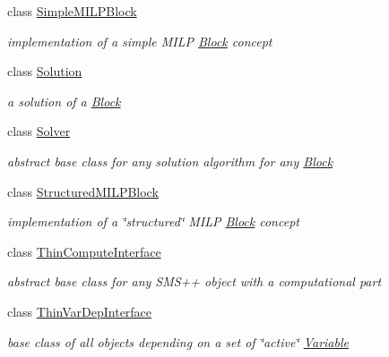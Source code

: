\begin{DoxyCompactItemize}
class \mbox{\hyperlink{class_s_m_spp__di__unipi__it_1_1_simple_m_i_l_p_block}{Simple\+M\+I\+L\+P\+Block}}
\begin{DoxyCompactList}\small\item\em implementation of a simple M\+I\+LP \mbox{\hyperlink{class_s_m_spp__di__unipi__it_1_1_block}{Block}} concept \end{DoxyCompactList}\item 
class \mbox{\hyperlink{class_s_m_spp__di__unipi__it_1_1_solution}{Solution}}
\begin{DoxyCompactList}\small\item\em a solution of a \mbox{\hyperlink{class_s_m_spp__di__unipi__it_1_1_block}{Block}} \end{DoxyCompactList}\item 
class \mbox{\hyperlink{class_s_m_spp__di__unipi__it_1_1_solver}{Solver}}
\begin{DoxyCompactList}\small\item\em abstract base class for any solution algorithm for any \mbox{\hyperlink{class_s_m_spp__di__unipi__it_1_1_block}{Block}} \end{DoxyCompactList}\item 
class \mbox{\hyperlink{class_s_m_spp__di__unipi__it_1_1_structured_m_i_l_p_block}{Structured\+M\+I\+L\+P\+Block}}
\begin{DoxyCompactList}\small\item\em implementation of a \char`\"{}structured\char`\"{} M\+I\+LP \mbox{\hyperlink{class_s_m_spp__di__unipi__it_1_1_block}{Block}} concept \end{DoxyCompactList}\item 
class \mbox{\hyperlink{class_s_m_spp__di__unipi__it_1_1_thin_compute_interface}{Thin\+Compute\+Interface}}
\begin{DoxyCompactList}\small\item\em abstract base class for any S\+M\+S++ object with a computational part \end{DoxyCompactList}\item 
class \mbox{\hyperlink{class_s_m_spp__di__unipi__it_1_1_thin_var_dep_interface}{Thin\+Var\+Dep\+Interface}}
\begin{DoxyCompactList}\small\item\em base class of all objects depending on a set of \char`\"{}active\char`\"{} \mbox{\hyperlink{class_s_m_spp__di__unipi__it_1_1_variable}{Variable}} \end{DoxyCompactList}\item 

\end{DoxyCompactItemize}
